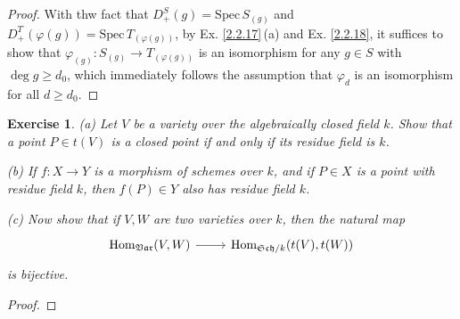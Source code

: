 \documentclass{amsart}
\newtheorem{exe}{Exercise}[subsection]
\begin{document}
\begin{proof}
   With thw fact that $D^S_+(g)=\mathrm{Spec}\,S_{(g)}$ and $D^T_+(\varphi(g))=\mathrm{Spec}\,T_{(\varphi(g))}$, by Ex. \ref{2.2.17}\,(a) and Ex. \ref{2.2.18}, it suffices to show that $\varphi_{(g)}:S_{(g)}\to T_{(\varphi(g))}$ is an isomorphism for any $g\in S$ with $\deg g\geq d_0$, which immediately follows the assumption that $\varphi_d$ is an isomorphism for all $d\geq d_0$.
\end{proof}

\begin{exe}
   (a) Let $V$ be a variety over the algebraically closed field $k$. Show that a point $P \in t(V)$ is a closed point if and only if its residue field is $k$.
   
   (b) If $f : X \to Y$ is a morphism of schemes over $k$, and if $P \in X$ is a point with residue field $k$, then $f(P) \in Y$ also has residue field $k$.
   
   (c) Now show that if $V,W$ are two varieties over $k$, then the natural map 
   \begin{equation*}
   	\begin{tikzcd}
   		{\mathrm{Hom}_{\mathfrak{Var}}(V,W)} \arrow[r] & {\mathrm{Hom}_{\mathfrak{Sch}/k}(t(V),t(W))}
   	\end{tikzcd}
   \end{equation*}
   is bijective.
\end{exe}

\begin{proof}
   
\end{proof}
\end{document}
